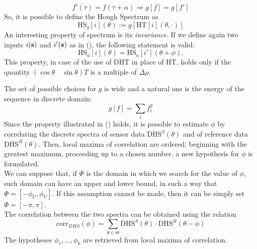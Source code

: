 \documentclass[a4paper, onecolumn]{report}
\begin{document}
\begin{equation}
	f'(\tau) = f(\tau + \alpha) \Rightarrow g[f] = g[f']
\end{equation}
So, it is possible to define the Hough Spectrum as
\begin{equation}
	\mbox{HS}_g[i](\theta) := g[\mbox{HT}[i](\theta, \cdot)]
\end{equation}
An interesting property of spectrum is its \emph{invariance}. If we define again two inputs $i(\bf{s})$ and $i'(\bf{s})$ as in (), the following statement is valid:
\begin{equation}
	\mbox{HS}_a[i](\theta) = \mbox{HS}_a[i'](\theta + \phi).
\end{equation}
This property, in case of the use of DHT in place of HT, holds only if the quantity $(\cos \theta \quad \sin \theta)T$ is a multiple of $\Delta\rho$.

The set of possible choices for $g$ is wide and a natural one is the energy of the sequence in discrete domain:
\begin{equation}
	g[f] = \sum_i f_i^2
\end{equation}
Since the property illustrated in () holds, it is possible to estimate $\phi$ by correlating the discrete spectra of sensor data $\mbox{DHS}^S(\theta)$ and of reference data $\mbox{DHS}^R(\theta)$. Then, local maxima of correlation are ordered; beginning with the greatest maximum, proceeding up to a chosen number, a new hypothesis for $\phi$ is formulated. \\
We can suppose that, if $\Phi$ is the domain in which we search for the value of $\phi$, such domain can have an upper and lower bound, in such a way that $\Phi = [-\phi_U, \phi_U]$. If this assumption cannot be made, then it can be simply set $\Phi = [-\pi, \pi]$. \\
The correlation between the two spectra can be obtained using the relation
\begin{equation}
	\mbox{corr}_{DHS}(\phi) = \sum_{\theta \in \Theta} \mbox{DHS}^S(\theta) \cdot \mbox{DHS}^R(\theta - \phi)
\end{equation}
The hypotheses ${\phi_1, \dots, \phi_k}$ are retrieved from local maxima of correlation.
\end{document}

